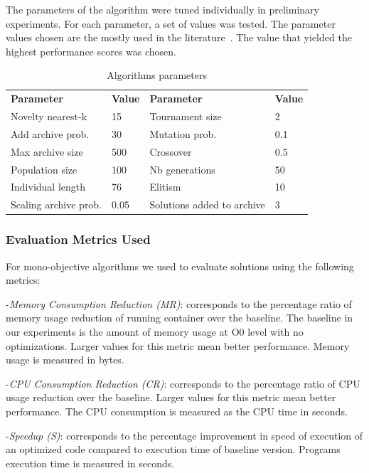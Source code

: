 The parameters of the algorithm were tuned individually in preliminary experiments. For each parameter, a set of values was tested. The parameter values chosen are the mostly used in the literature~\cite{lehman2008exploiting}. The value that yielded the highest performance scores was chosen.  

\begin{table}
	\caption{Algorithms parameters}
	\begin{tabular}{| l |l| l |l| }\hline
		\textbf{Parameter} & \textbf{Value} & \textbf{Parameter} & \textbf{Value} \\	\hhline{|=|=|=|=|}	
		Novelty nearest-k  & 15 &  Tournament size & 2\\ 
		Add archive prob. & 30 &  Mutation prob. & 0.1\\  
		Max archive size & 500 &  Crossover & 0.5  \\  
		Population size & 100 &  Nb generations &  50 \\  
		Individual length & 76 & Elitism & 10  \\ 
		Scaling archive prob. & 0.05 & Solutions added to archive & 3  \\ 	\hline
	\end{tabular}
\end{table}

\subsubsection{Evaluation Metrics Used}

For mono-objective algorithms we used to evaluate solutions using the following metrics:

-\textit{Memory Consumption Reduction (MR)}: corresponds to the percentage ratio of memory usage reduction of running container over the baseline. The baseline in our experiments is the amount of memory usage at O0 level with no optimizations. Larger values for this metric mean better performance. Memory usage is measured in bytes.

-\textit{CPU Consumption Reduction (CR)}: corresponds to the percentage ratio of CPU usage reduction over the baseline. Larger values for this metric mean better performance. The CPU consumption is measured as the CPU time in seconds.

-\textit{Speedup (S)}: corresponds to the percentage improvement in speed of execution of an optimized code compared to execution time of baseline version. Programs execution time is measured in seconds.



